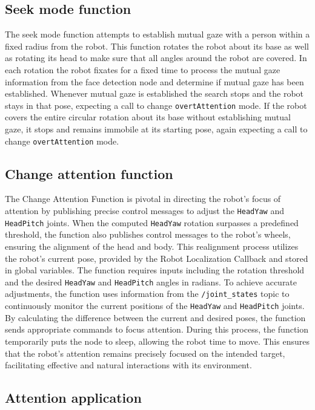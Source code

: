 \documentclass{CSSRforAfrica}
\begin{document}
\subsection{Seek mode function}

The seek mode function attempts to establish mutual gaze with a person within a fixed radius from the robot. This function rotates the robot about its base as well as rotating its head to make sure that all angles around the robot are covered. In each rotation the robot fixates for a fixed time to process the mutual gaze information from the face detection node and determine if mutual gaze has been established. Whenever mutual gaze is established the search stops and the robot stays in that pose, expecting a call to change \texttt{overtAttention} mode. If the robot covers the entire circular rotation about its base without establishing mutual gaze, it stops and remains immobile at its starting pose, again expecting a call to change \texttt{overtAttention} mode.

\subsection{Change attention function}

The Change Attention Function is pivotal in directing the robot's focus of attention by publishing precise control messages to adjust the \texttt{HeadYaw} and \texttt{HeadPitch} joints. When the computed \texttt{HeadYaw} rotation surpasses a predefined threshold, the function also publishes control messages to the robot’s wheels, ensuring the alignment of the head and body. This realignment process utilizes the robot's current pose, provided by the Robot Localization Callback and stored in global variables. The function requires inputs including the rotation threshold and the desired \texttt{HeadYaw} and \texttt{HeadPitch} angles in radians. To achieve accurate adjustments, the function uses information from the \texttt{/joint\_states} topic to continuously monitor the current positions of the \texttt{HeadYaw} and \texttt{HeadPitch} joints. By calculating the difference between the current and desired poses, the function sends appropriate commands to focus attention. During this process, the function temporarily puts the node to sleep, allowing the robot time to move. This ensures that the robot's attention remains precisely focused on the intended target, facilitating effective and natural interactions with its environment.

\subsection{Attention application}
\end{document}
